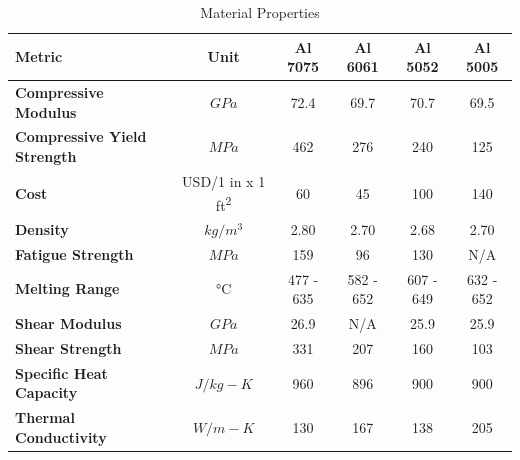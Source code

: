 \begin{table}[H]
\centering
\begin{tabular}{|l|c|c|c|c|c|} 
\hline
    \textbf{Metric} & \textbf{Unit} & \textbf{Al 7075} & \textbf{Al 6061} & \textbf{Al 5052} & \textbf{Al 5005}
    \\
\hline
    \textbf{Compressive Modulus}\cite{ASM} & $GPa$ & 72.4 & 69.7 & 70.7 & 69.5
    \\
\hline
    \textbf{Compressive Yield Strength}\cite{ASM} & $MPa$ & 462 & 276 & 240 & 125
    \\
\hline
    \textbf{Cost}\cite{mwsaa} & USD/1 in x 1 ft\textsuperscript{2}  & 60 & 45 & 100 &  140
    \\
\hline
    \textbf{Density}\cite{ASM}& $kg/m^3$ & 2.80 & 2.70 & 2.68 & 2.70
    \\
\hline
    \textbf{Fatigue Strength}\cite{ASM} & $MPa$ & 159 & 96 & 130 & N/A 
    \\
\hline
    \textbf{Melting Range}\cite{ASM} & °C & 477 - 635 & 582 - 652 & 607 - 649 & 632 - 652
    \\
\hline
    \textbf{Shear Modulus}\cite{ASM} & $GPa$ & 26.9 & N/A & 25.9 & 25.9 
    \\
\hline
    \textbf{Shear Strength}\cite{ASM} & $MPa$ & 331 & 207 & 160 & 103
    \\
\hline
    \textbf{Specific Heat Capacity}\cite{ASM} & $J/{kg-K}$ & 960 & 896 & 900 & 900
    \\
\hline
    \textbf{Thermal Conductivity}\cite{ASM} & $W/{m-K}$ & 130 & 167 & 138 & 205 
    \\

\hline
\end{tabular}
\caption{Material Properties}
\label{tbl:material_Props}
\end{table}

